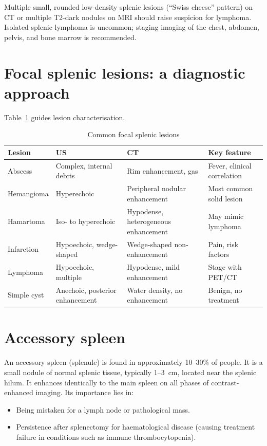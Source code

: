 \begin{pearlbox}
Multiple small, rounded low-density splenic lesions (``Swiss cheese'' pattern) on CT or multiple T2-dark nodules on MRI should raise suspicion for lymphoma. Isolated splenic lymphoma is uncommon; staging imaging of the chest, abdomen, pelvis, and bone marrow is recommended.
\end{pearlbox}

\section{Focal splenic lesions: a diagnostic approach}
Table~\ref{tab:splenic_lesions} guides lesion characterisation.

\begin{table}[h]
\centering
\caption{Common focal splenic lesions}
\label{tab:splenic_lesions}
\begin{tabular}{@{}p{}p{}p{}p{}@{}}
\hline
\textbf{Lesion} & \textbf{US} & \textbf{CT} & \textbf{Key feature} \\
\hline
Abscess & Complex, internal debris & Rim enhancement, gas & Fever, clinical correlation \\
Hemangioma & Hyperechoic & Peripheral nodular enhancement & Most common solid lesion \\
Hamartoma & Iso- to hyperechoic & Hypodense, heterogeneous enhancement & May mimic lymphoma \\
Infarction & Hypoechoic, wedge-shaped & Wedge-shaped non-enhancement & Pain, risk factors \\
Lymphoma & Hypoechoic, multiple & Hypodense, mild enhancement & Stage with PET/CT \\
Simple cyst & Anechoic, posterior enhancement & Water density, no enhancement & Benign, no treatment \\
\hline
\end{tabular}
\end{table}

\section{Accessory spleen}
An accessory spleen (splenule) is found in approximately 10--30\% of people. It is a small nodule of normal splenic tissue, typically 1--3~cm, located near the splenic hilum. It enhances identically to the main spleen on all phases of contrast-enhanced imaging. Its importance lies in:
\begin{itemize}
    \item Being mistaken for a lymph node or pathological mass.
    \item Persistence after splenectomy for haematological disease (causing treatment failure in conditions such as immune thrombocytopenia).
\end{itemize}


